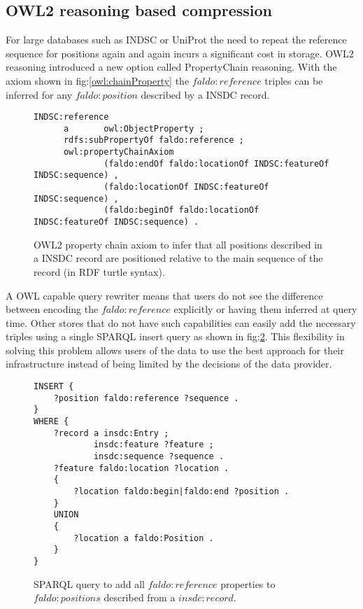 \subsection*{OWL2 reasoning based compression}
For large databases such as INDSC or UniProt the need to repeat the reference sequence for positions again and again incurs a significant cost in storage.
OWL2 reasoning introduced a new option called PropertyChain reasoning. 
With the axiom shown in fig:\ref{owl:chainProperty} the $faldo:reference$ triples can be inferred for any $faldo:position$ described by a INSDC record.
\begin{figure}
\begin{verbatim}
INDSC:reference
      a       owl:ObjectProperty ;
      rdfs:subPropertyOf faldo:reference ;
      owl:propertyChainAxiom
              (faldo:endOf faldo:locationOf INDSC:featureOf INDSC:sequence) , 
              (faldo:locationOf INDSC:featureOf INDSC:sequence) , 
              (faldo:beginOf faldo:locationOf INDSC:featureOf INDSC:sequence) .

\end{verbatim}
\caption{OWL2 property chain axiom to infer that all positions described in a INSDC record are positioned relative to the main sequence of the record (in RDF turtle syntax).}
\label{owl:chainProprty}
\end{figure}
A OWL capable query rewriter means that users do not see the difference between encoding the $faldo:reference$ explicitly or having them inferred at query time.
Other stores that do not have such capabilities can easily add the necessary triples using a single SPARQL insert query as shown in fig:\ref{sparql:chainProperty}. This flexibility in solving this problem allows users of the data to use the best approach for their infrastructure instead of being limited by the decisions of the data provider.
\begin{figure}
\begin{verbatim}
INSERT {
    ?position faldo:reference ?sequence .
}
WHERE {
    ?record a insdc:Entry ;
            insdc:feature ?feature ;
            insdc:sequence ?sequence .
    ?feature faldo:location ?location .
    {
        ?location faldo:begin|faldo:end ?position .
    }
    UNION
    {
        ?location a faldo:Position .
    }
}
\end{verbatim}
\caption{SPARQL query to add all $faldo:reference$ properties to $faldo:positions$ described from a $insdc:record$.}
\label{sparql:chainProperty}
\end{figure}

